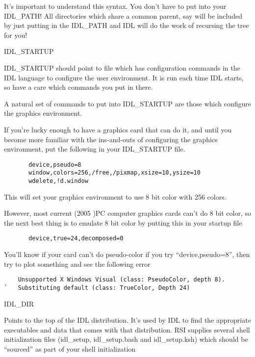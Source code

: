      It's important to understand this syntax. You don't have to put
   into your IDL\_PATH! All directories
  which share a common parent, say   will be included
  by just putting  in the IDL\_PATH and IDL will do
  the work of recursing the tree for you!


   \item IDL\_STARTUP

     IDL\_STARTUP should point to file which has configuration
     commands in the IDL language to configure the user environment. It
     is run each time IDL starts, so have a care which commands you put
     in there.


     A natural set of commands to put into IDL\_STARTUP are those
     which configure the graphics environment. 


     If you're lucky enough to have a graphics card that can do it, and
     until you become more familiar with the ins-and-outs of configuring
     the graphics environment, put the following in your IDL\_STARTUP file.

    \begin{verbatim}
       device,pseudo=8
       window,colors=256,/free,/pixmap,xsize=10,ysize=10
       wdelete,!d.window
    \end{verbatim}

    This will set your graphics environment to use 8 bit color with
    256 colors.

   However, most current (2005 )PC computer graphics cards can't do 8
   bit color, so the next best thing is to emulate 8 bit color by
   putting this in your startup file

    \begin{verbatim}
       device,true=24,decomposed=0
    \end{verbatim}

    You'll know if your card can't do pseudo-color if you try
    ``device,pseudo=8'', then try to plot something and see the
    following error 

    \begin{verbatim}    
	Unsupported X Windows Visual (class: PseudoColor, depth 8).
`	Substituting default (class: TrueColor, Depth 24)
    \end{verbatim}



    \item{IDL\_DIR} 

     Points to the top of the IDL distribution. It's used by IDL to find
     the appropriate executables and data that comes with that
     distribution. RSI supplies several shell initialization files
     (idl\_setup, idl\_setup.bash and idl\_setup.ksh) which should be
     ``sourced'' as part of your shell initialization

